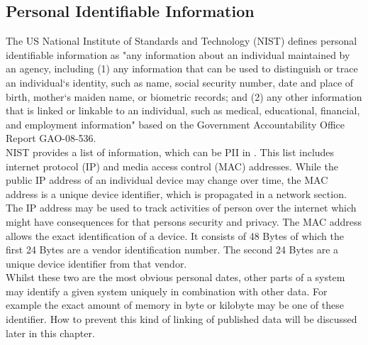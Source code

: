     \subsection{Personal Identifiable Information}
        The US National Institute of Standards and Technology (NIST) defines personal identifiable information as "any information about an individual maintained by an agency, including (1) any information that can be used to distinguish or trace an individual‘s identity, such as name, social security number, date and place of birth, mother‘s maiden name, or biometric records; and (2) any other information that is linked or linkable to an individual, such as medical, educational, financial, and employment information"\cite{mccallister_guide_2010} based on the Government Accountability Office Report GAO-08-536\cite{government_accountability_office_privacy_2008}.\\
        NIST provides a list of information, which can be PII in \cite{mccallister_guide_2010}. This list includes internet protocol (IP) and media access control (MAC) addresses. While the public IP address of an individual device may change over time, the MAC address is a unique device identifier, which is propagated in a network section.
        The IP address may be used to track activities of person over the internet which might have consequences for that persons security and privacy. 
        The MAC address allows the exact identification of a device. It consists of 48 Bytes of which the first 24 Bytes are a vendor identification number. The second 24 Bytes are a unique device identifier from that vendor.\\
        Whilst these two are the most obvious personal dates, other parts of a system may identify 
        a given system uniquely in combination with other data. For example the exact amount of memory in byte or kilobyte may be one of these identifier. How to prevent this kind of linking of published data will be discussed later in this chapter.\\
        
